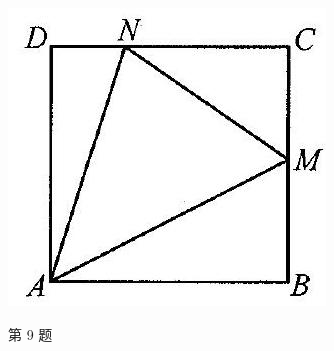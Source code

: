 \documentclass[10pt]{article}
\begin{document}
\includegraphics[max width=\textwidth, center]{2024_10_30_26b590fd1106d28139f0g-121(1)}

第 9 题
\end{document}
